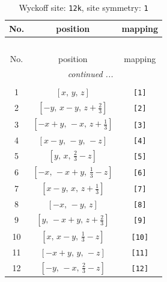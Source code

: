 \documentclass[fleqn,8pt]{jsarticle}
\begin{document}
\renewcommand{\arraystretch}{1.2}
\begin{longtable}{ccc}
\caption{Wyckoff site: {\tt 12k}, site symmetry: {\tt 1}}
 \\
 \hline \hline
No. & position & mapping \\ \hline \endfirsthead

\multicolumn{2}{l}{\tablename\ \thetable{}} \\
 \hline \hline
No. & position & mapping \\ \hline \endhead

 \hline \hline
\multicolumn{2}{r}{\footnotesize\it continued ...} \\ \endfoot

 \hline \hline
\multicolumn{2}{r}{} \\ \endlastfoot

1 & $\left[ x,\, y,\, z \right]$ & {\tt [1]} \\ \hline
2 & $\left[ - y,\, x - y,\, z + \frac{2}{3} \right]$ & {\tt [2]} \\ \hline
3 & $\left[ - x + y,\, - x,\, z + \frac{1}{3} \right]$ & {\tt [3]} \\ \hline
4 & $\left[ x - y,\, - y,\, - z \right]$ & {\tt [4]} \\ \hline
5 & $\left[ y,\, x,\, \frac{2}{3} - z \right]$ & {\tt [5]} \\ \hline
6 & $\left[ - x,\, - x + y,\, \frac{1}{3} - z \right]$ & {\tt [6]} \\ \hline
7 & $\left[ x - y,\, x,\, z + \frac{1}{3} \right]$ & {\tt [7]} \\ \hline
8 & $\left[ - x,\, - y,\, z \right]$ & {\tt [8]} \\ \hline
9 & $\left[ y,\, - x + y,\, z + \frac{2}{3} \right]$ & {\tt [9]} \\ \hline
10 & $\left[ x,\, x - y,\, \frac{1}{3} - z \right]$ & {\tt [10]} \\ \hline
11 & $\left[ - x + y,\, y,\, - z \right]$ & {\tt [11]} \\ \hline
12 & $\left[ - y,\, - x,\, \frac{2}{3} - z \right]$ & {\tt [12]} \\
\end{longtable}
\end{document}
